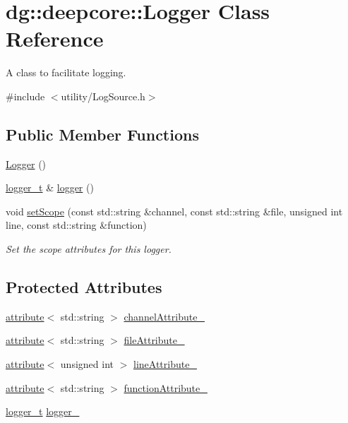 \hypertarget{classdg_1_1deepcore_1_1_logger}{}\section{dg\+:\+:deepcore\+:\+:Logger Class Reference}
\label{classdg_1_1deepcore_1_1_logger}


A class to facilitate logging.  




{\ttfamily \#include $<$utility/\+Log\+Source.\+h$>$}

\subsection*{Public Member Functions}
\begin{DoxyCompactItemize}
\item 
\hyperlink{classdg_1_1deepcore_1_1_logger_ad757afdbd753af92bb9858dbf868746c}{Logger} ()
\item 
\hyperlink{namespacedg_1_1deepcore_acaeda2fb8a475fd1de2ef14ac9ec7a2f}{logger\+\_\+t} \& \hyperlink{classdg_1_1deepcore_1_1_logger_abe36ca0960079ec47a53414d1a0d4e11}{logger} ()
\item 
void \hyperlink{classdg_1_1deepcore_1_1_logger_ad3fab1d86034c5eb5d76ac54668890d8}{set\+Scope} (const std\+::string \&channel, const std\+::string \&file, unsigned int line, const std\+::string \&function)
\begin{DoxyCompactList}\small\item\em Set the scope attributes for this logger. \end{DoxyCompactList}\end{DoxyCompactItemize}
\subsection*{Protected Attributes}
\begin{DoxyCompactItemize}
\item 
\hyperlink{namespacedg_1_1deepcore_abfee748fb46325389237ecd4d1d7f21b}{attribute}$<$ std\+::string $>$ \hyperlink{classdg_1_1deepcore_1_1_logger_af00fae5beb806f1da15a373aebef47b8}{channel\+Attribute\+\_\+}
\item 
\hyperlink{namespacedg_1_1deepcore_abfee748fb46325389237ecd4d1d7f21b}{attribute}$<$ std\+::string $>$ \hyperlink{classdg_1_1deepcore_1_1_logger_aac43d5d218af238cb8986e88b8869c2b}{file\+Attribute\+\_\+}
\item 
\hyperlink{namespacedg_1_1deepcore_abfee748fb46325389237ecd4d1d7f21b}{attribute}$<$ unsigned int $>$ \hyperlink{classdg_1_1deepcore_1_1_logger_a24747695ff0705357175723df9f12b56}{line\+Attribute\+\_\+}
\item 
\hyperlink{namespacedg_1_1deepcore_abfee748fb46325389237ecd4d1d7f21b}{attribute}$<$ std\+::string $>$ \hyperlink{classdg_1_1deepcore_1_1_logger_a06e46109c370c3cf591175abfd3bfc91}{function\+Attribute\+\_\+}
\item 
\hyperlink{namespacedg_1_1deepcore_acaeda2fb8a475fd1de2ef14ac9ec7a2f}{logger\+\_\+t} \hyperlink{classdg_1_1deepcore_1_1_logger_a56b6829ddf4b1bce3d269f4cb89f0e3b}{logger\+\_\+}
\end{DoxyCompactItemize}


